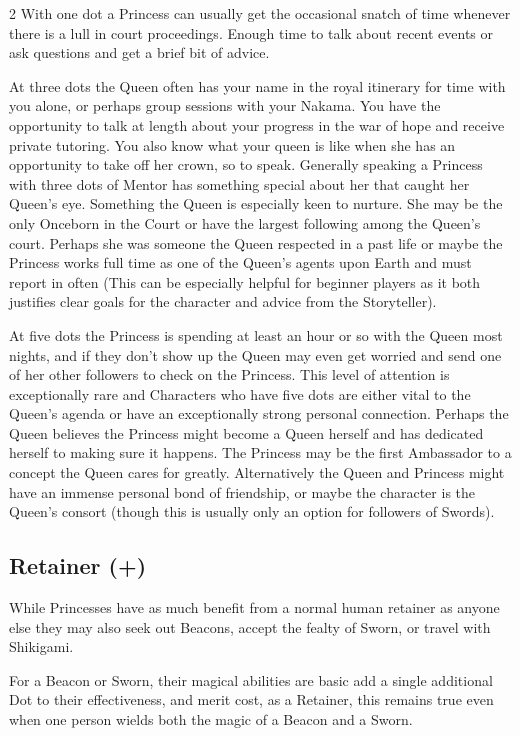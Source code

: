 \begin{multicols}{2}
With one dot a Princess can usually get the occasional snatch of time whenever there is a lull in court proceedings. Enough time to talk about recent events or ask questions and get a brief bit of advice.

At three dots the Queen often has your name in the royal itinerary for time with you alone, or perhaps group sessions with your Nakama. You have the opportunity to talk at length about your progress in the war of hope and receive private tutoring. You also know what your queen is like when she has an opportunity to take off her crown, so to speak. Generally speaking a Princess with three dots of Mentor has something special about her that caught her Queen's eye. Something the Queen is especially keen to nurture. She may be the only Onceborn in the Court or have the largest following among the Queen's court. Perhaps she was someone the Queen respected in a past life or maybe the Princess works full time as one of the Queen's agents upon Earth and must report in often (This can be especially helpful for beginner players as it both justifies clear goals for the character and advice from the Storyteller).

At five dots the Princess is spending at least an hour or so with the Queen most nights, and if they don't show up the Queen may even get worried and send one of her other followers to check on the Princess. This level of attention is exceptionally rare and Characters who have five dots are either vital to the Queen's agenda or have an exceptionally strong personal connection. Perhaps the Queen believes the Princess might become a Queen herself and has dedicated herself to making sure it happens. The Princess may be the first Ambassador to a concept the Queen cares for greatly. Alternatively the Queen and Princess might have an immense personal bond of friendship, or maybe the character is the Queen's consort (though this is usually only an option for followers of Swords).

\subsection*{Retainer (\textbullet+)}

While Princesses have as much benefit from a normal human retainer as anyone else they may also seek out Beacons, accept the fealty of Sworn, or travel with Shikigami. 

For a Beacon or Sworn, their magical abilities are basic add a single additional Dot to their effectiveness, and merit cost, as a Retainer, this remains true even when one person wields both the magic of a Beacon and a Sworn. 


\end{multicols}
